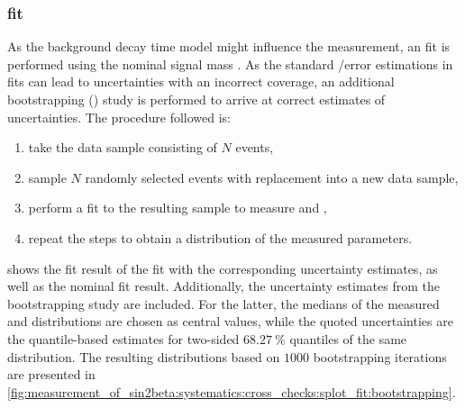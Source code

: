 \subsubsection{\sPlot fit}
\label{sec:measurement_of_sin2beta:systematics:cross_checks:splot_fit}
%
As the background decay time model might influence the measurement, an \sPlot fit is
performed using the nominal signal mass \PDF. As the standard \Minuit/\Hesse error
estimations in \sPlot fits can lead to uncertainties with an incorrect coverage,
an additional bootstrapping (\cf \eg \cite{Behnke:2013pga}) study is performed
to arrive at correct estimates of uncertainties. The procedure followed is:
%
\begin{enumerate}
  \item take the \sweighted data sample consisting of $N$ events,
  \item sample $N$ randomly selected events with replacement into a new data sample,
  \item perform a fit to the resulting sample to measure \SJpsiKS and \CJpsiKS,
  \item repeat the steps to obtain a distribution of the measured \CP parameters.
\end{enumerate}
%
shows the fit result of the \sPlot fit with the corresponding \Hesse uncertainty
estimates, as well as the nominal fit result. Additionally, the uncertainty
estimates from the bootstrapping study are included. For the latter, the
medians of the measured \SJpsiKS and \CJpsiKS distributions are chosen as
central values, while the quoted uncertainties are the quantile-based estimates
for two-sided $\SI{68.27}{\percent}$ quantiles of the same distribution. The
resulting distributions based on $\num{1000}$ bootstrapping iterations are
presented in
\cref{fig:measurement_of_sin2beta:systematics:cross_checks:splot_fit:bootstrapping}.

